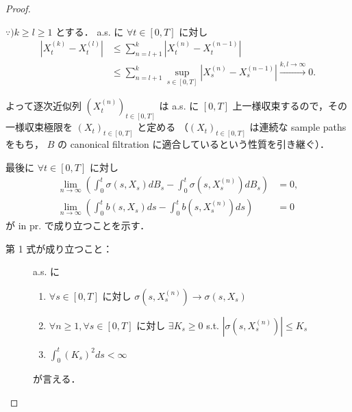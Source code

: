 \documentclass{jsarticle}
\begin{document}
\begin{proof}
\begin{enumerate}[label=(\roman*)]
        \begin{screen}
            $\because) k\ge l\ge1$ とする．
            a.s. に $\forall t\in[0, T]$ に対し
            \begin{align}
                \left\lvert X_t^{(k)}-X_t^{(l)}\right\rvert
                &\le \sum_{n=l+1}^{k}\left\lvert X_t^{(n)}-X_t^{(n-1)}\right\rvert \\
                &\le \sum_{n=l+1}^{k}\sup_{s\in[0, T]}\left\lvert X_s^{(n)}-X_s^{(n-1)}\right\rvert
                \xrightarrow{k, l\to\infty}0.
            \end{align}
        \end{screen}
        
        よって逐次近似列 $(X_t^{(n)})_{t\in[0, T]}$ は a.s. に $[0, T]$ 上一様収束するので，その一様収束極限を $(X_t)_{t\in[0, T]}$ と定める
        （$(X_t)_{t\in[0, T]}$ は連続な sample paths をもち， $B$ の canonical filtration に適合しているという性質を引き継ぐ）．

        最後に $\forall t\in[0, T]$ に対し
        \begin{align}
            \lim_{n\to\infty}(\int_0^t \sigma(s, X_s)dB_s-\int_0^t \sigma(s, X_s^{(n)})dB_s)
            &= 0, \\
            \lim_{n\to\infty}(\int_0^t b(s, X_s)ds-\int_0^t b(s, X_s^{(n)})ds)
            &= 0
        \end{align}
        が in pr. で成り立つことを示す．

        \begin{description}
            \item[第 1 式が成り立つこと：] 
            a.s. に
            \begin{enumerate}[label=(\roman*)]
                \item
                $\forall s\in[0, T]$ に対し $\sigma(s, X_s^{(n)})\to\sigma(s, X_s)$
                \item
                $\forall n\ge1, \forall s\in[0, T]$ に対し $\exists K_s\ge0$ s.t. $\left\lvert \sigma(s, X_s^{(n)})\right\rvert\le K_s$
                \item
                $\int_0^t (K_s)^2 ds<\infty$
            \end{enumerate}
            が言える．


\end{description}
\end{enumerate}
\end{proof}
\end{document}
